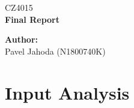 \documentclass[12pt,a4paper]{article}
\begin{document}
\begin{titlepage}
  \thispagestyle{fancy}

  \vspace*{\fill}
  \begin{center}
    {\fontsize{20}{30}\selectfont CZ4015}\\[1cm]
    {\fontsize{30}{100}\selectfont \textbf{Final Report}}\\[4.2cm]
  \end{center}

  \vspace*{\fill}

  {\fontsize{10}{10} \selectfont \noindent
  \textbf{Author:}\\
  Pavel Jahoda (N1800740K)
  }
\end{titlepage}

\renewcommand{\headrulewidth}{0.4pt}
\renewcommand{\footrulewidth}{0.4pt}


\tableofcontents

\newpage


\section{Input Analysis}
\end{document}
